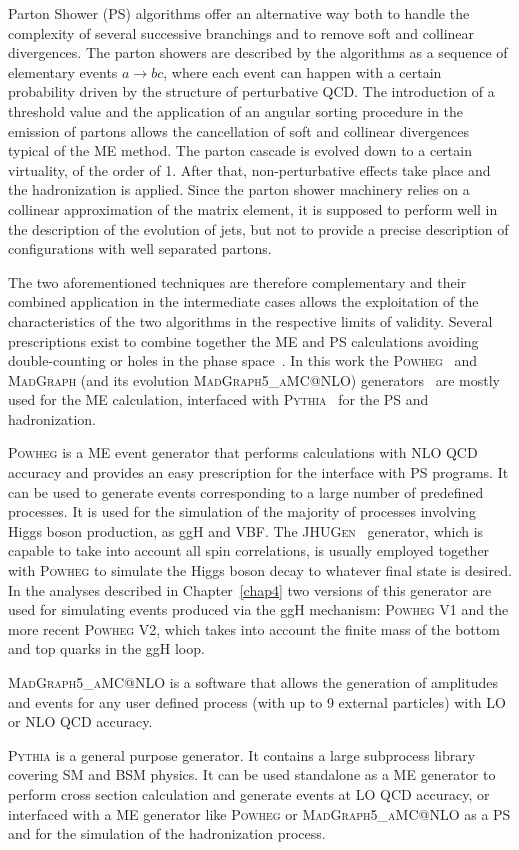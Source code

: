 Parton Shower (PS) algorithms offer an alternative way both to handle the complexity of several successive branchings and to remove soft and collinear divergences. The parton showers are described by the algorithms as a sequence of elementary events $a\to bc$, where each event can happen with a certain probability driven by the structure of perturbative QCD. The introduction of a threshold value
and the application of an angular sorting procedure in the emission of partons allows the cancellation of soft and collinear divergences typical of the ME method. The parton cascade is evolved down to a certain virtuality, of the order of 1\GeV. After that, non-perturbative effects take place and the hadronization is applied. Since the parton shower machinery relies on a collinear approximation of the matrix element, it is supposed to perform well in the description of the evolution of jets, but not to provide a precise description of configurations with well separated partons.

The two aforementioned techniques are therefore complementary and their combined application in the intermediate cases allows the exploitation of the characteristics of the two algorithms in the respective limits of validity. Several prescriptions exist to combine together the ME and PS calculations avoiding double-counting or holes in the phase space~\cite{Hoche:2006ph}.
In this work the \textsc{Powheg}~\cite{Frixione:2007vw,Alioli:2008tz,Nason:2009ai} and \textsc{MadGraph} (and its evolution \textsc{MadGraph5\_aMC@NLO}) generators~\cite{Alwall:2014hca} are mostly used for the ME calculation, interfaced with \textsc{Pythia}~\cite{Sjostrand:2006za,Sjostrand:2007gs} for the PS and hadronization. 

\textsc{Powheg} is a ME event generator that performs calculations with NLO QCD accuracy and provides an easy prescription for the interface with PS programs. It can be used to generate events corresponding to a large number of predefined processes. It is used for the simulation of the majority of processes involving Higgs boson production, as ggH and VBF. The \textsc{JHUGen}~\cite{JHUGen} generator, which is capable to take into account all spin correlations, is usually employed together with \textsc{Powheg} to simulate the Higgs boson decay to whatever final state is desired. In the analyses described in Chapter~\ref{chap4} two versions of this generator are used for simulating events produced via the ggH mechanism: \textsc{Powheg V1} and the more recent \textsc{Powheg V2}, which takes into account the finite mass of the bottom and top quarks in the ggH loop.

\textsc{MadGraph5\_aMC@NLO} is a software that allows the generation of amplitudes and events for any user defined process (with up to 9 external particles) with LO or NLO QCD accuracy.

\textsc{Pythia} is a general purpose generator. It contains a large subprocess library covering SM and BSM physics. It can be used standalone as a ME generator to perform cross section calculation and generate events at LO QCD accuracy, or interfaced with a ME generator like \textsc{Powheg} or \textsc{MadGraph5\_aMC@NLO} as a PS and for the simulation of the hadronization process.

